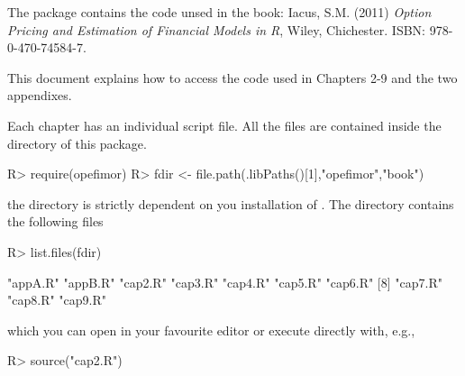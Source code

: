 \documentclass[11pt]{article}
\date{}
\begin{document}
The  package contains the \R{} code unsed in the book:
Iacus, S.M. (2011) {\it Option Pricing and
		Estimation of Financial Models in R}, Wiley, Chichester. ISBN:
        978-0-470-74584-7.

\bigskip

This document explains how to access the \R{} code used in Chapters 2-9 and the two appendixes.
\bigskip
\noindent

Each chapter has an individual \R{} script file. All the files are contained inside the  directory
of this package.
\begin{Schunk}
\begin{Sinput}
R> require(opefimor)
R> fdir <- file.path(.libPaths()[1],"opefimor","book")
\end{Sinput}
\end{Schunk}
the directory  is strictly dependent on you installation of \R{}. The directory contains the following files
\begin{Schunk}
\begin{Sinput}
R> list.files(fdir)
\end{Sinput}
\begin{Soutput}
 [1] "appA.R" "appB.R" "cap2.R" "cap3.R" "cap4.R" "cap5.R" "cap6.R"
 [8] "cap7.R" "cap8.R" "cap9.R"
\end{Soutput}
\end{Schunk}
which you can open in your favourite editor or execute directly with, e.g.,
\begin{Schunk}
\begin{Sinput}
R> source("cap2.R")
\end{Sinput}
\end{Schunk}
\end{document}
